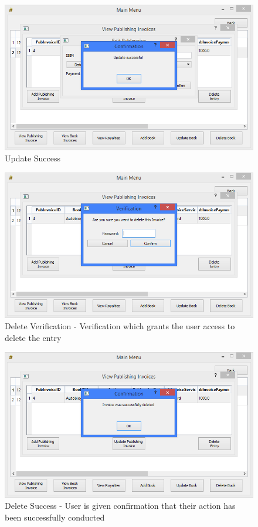 \begin{figure}[H]
    \caption{Update Success} \label{fig:UpdatePubInvoiceSuccess}
    \includegraphics[width=\textwidth]{./Maintenance/UserInterface/UpdatePubInvoiceSuccess.png}
\end{figure}

\begin{figure}[H]
    \caption{Delete Verification - Verification which grants the user access to delete the entry} \label{fig:DeletePubInvoice}
    \includegraphics[width=\textwidth]{./Maintenance/UserInterface/DeletePubInvoice.png}
\end{figure}

\begin{figure}[H]
    \caption{Delete Success - User is given confirmation that their action has been successfully conducted} \label{fig:DeletePubInvoiceSuccess}
    \includegraphics[width=\textwidth]{./Maintenance/UserInterface/DeletePubInvoiceSuccess.png}
\end{figure}

